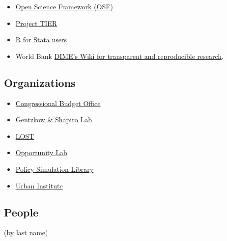 \documentclass[]{book}
\providecommand{\tightlist}{%
  \setlength{\itemsep}{0pt}\setlength{\parskip}{0pt}}
\begin{document}
\begin{itemize}
\item
  \href{https://osf.io}{Open Science Framework (OSF)}
\item
  \href{https://www.projecttier.org/tier-protocol/}{Project TIER}\\
\item
  \href{https://github.com/hblackburn/R4Econ/blob/master/Resources.md}{R for Stata users}\\
\item
  World Bank \href{https://dimewiki.worldbank.org/wiki/Main_Page}{DIME's Wiki for transparent and reproducible research}.
\end{itemize}

\hypertarget{organizations}{%
\subsection{Organizations}\label{organizations}}

\begin{itemize}
\tightlist
\item
  \href{https://github.com/US-CBO}{Congressional Budget Office}
\item
  \href{https://github.com/gslab-econ}{Gentzkow \& Shapiro Lab}
\item
  \href{https://lost-stats.github.io/}{LOST}
\item
  \href{https://github.com/Opportunitylab}{Opportunity Lab}
\item
  \href{https://github.com/PSLmodels}{Policy Simulation Library}
\item
  \href{https://github.com/UrbanInstitute}{Urban Institute}
\end{itemize}

\hypertarget{people}{%
\subsection{People}\label{people}}

(by last name)
\end{document}
